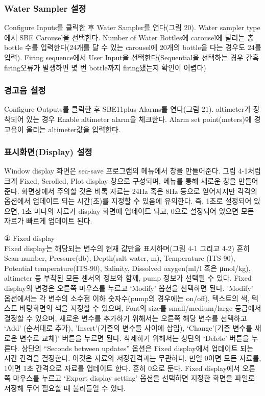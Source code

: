 \documentclass[
]{book}
\begin{document}
\hypertarget{water-sampler-uxc124uxc815}{%
\subsubsection{Water Sampler 설정}\label{water-sampler-uxc124uxc815}}

Configure Inputs를 클릭한 후 Water Sampler를 연다(그림 20). Water sampler type에서 SBE Carousel을 선택한다. Number of Water Bottles에 carousel에 달리는 총 bottle 수를 입력한다(24개를 달 수 있는 carousel에 20개의 bottle을 다는 경우도 24를 입력). Firing sequence에서 User Input을 선택한다(Sequential을 선택하는 경우 간혹 firing오류가 발생하면 몇 번 bottle까지 firing됐는지 확인이 어렵다)

\hypertarget{uxacbduxace0uxc74c-uxc124uxc815}{%
\subsubsection{경고음 설정}\label{uxacbduxace0uxc74c-uxc124uxc815}}

Configure Outputs를 클릭한 후 SBE11plus Alarms를 연다(그림 21). altimeter가 장착되어 있는 경우 Enable altimeter alarm을 체크한다. Alarm set point(meters)에 경고음이 울리는 altimeter값을 입력한다.

\hypertarget{uxd45cuxc2dcuxd654uxba74display-uxc124uxc815}{%
\subsubsection{표시화면(Display) 설정}\label{uxd45cuxc2dcuxd654uxba74display-uxc124uxc815}}

Window display 화면은 sea-save 프로그램의 메뉴에서 창을 만들어준다. 그림 4-1처럼 크게 Fixed, Scrolled, Plot display 창으로 구성되며, 메뉴를 통해 새로운 창을 만들어준다. 화면상에서 주의할 것은 비록 자료는 24Hz 혹은 8Hz 등으로 얻어지지만 각각의 옵션에서 업데이트 되는 시간(초)를 지정할 수 있음에 유의한다. 즉, 1초로 설정되어 있으면, 1초 마다의 자료가 display 화면에 업데이트 되고, 0으로 설정되어 있으면 모든 자료가 빠르게 업데이트 된다.

① Fixed display\\
Fixed display는 해당되는 변수의 현재 값만을 표시하며(그림 4-1 그리고 4-2) 흔히 Scan number, Pressure(db), Depth(salt water, m), Temperature (ITS-90), Potential temperature(ITS-90), Salinity, Dissolved oxygen(ml/l 혹은 μmol/kg), altimeter 등 부착된 모든 센서의 정보와 함께, pump 정보가 선택될 수 있다. Fixed display의 변경은 오른쪽 마우스를 누르고 `Modify' 옵션을 선택하면 된다. 'Modify' 옵션에서는 각 변수의 소수점 이하 숫자수(pump의 경우에는 on/off), 텍스트의 색, 텍스트 바탕화면의 색을 지정할 수 있으며, Font의 size를 small/medium/large 등급에서 결정할 수 있으며, 새로운 변수를 추가하기 위해서는 오른쪽 해당 변수를 선택하고 `Add' (순서대로 추가), 'Insert'(기존의 변수들 사이에 삽입), `Change'(기존 변수를 새로운 변수로 교체)' 버튼을 누르면 된다. 삭제하기 위해서는 상단의 `Delete' 버튼을 누른다. 상단의 ``Seconds between updates'' 옵션은 Fixed display에서 업데이트 되는 시간 간격을 결정한다. 이것은 자료의 저장간격과는 무관하다. 만일 0이면 모든 자료를, 1이면 1초 간격으로 자료를 업데이트 한다. 흔히 0으로 둔다. Fixed display에서 오른쪽 마우스를 누르고 `Export display setting' 옵션을 선택하면 지정한 화면을 파일로 저장해 두어 필요할 때 불러들일 수 있다.
\end{document}
